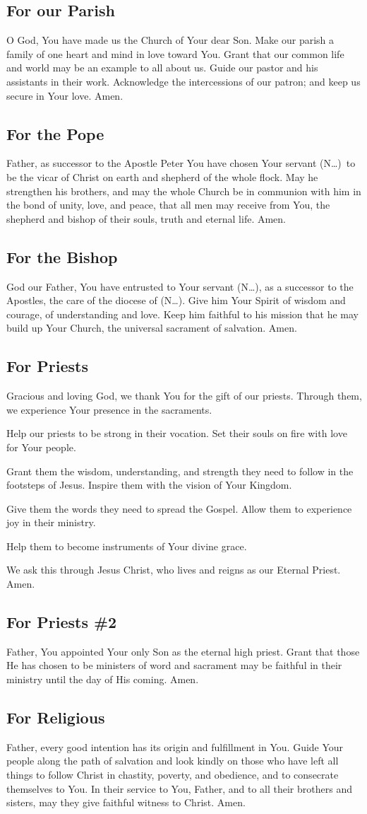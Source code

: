 \documentclass[12pt]{article}
\newcommand{\prayertitle}[1]{\subsection{#1}}
\newcommand{\insertname}{(N\dots)}
\begin{document}
\prayertitle{For our Parish}
O God, You have made us the Church of Your dear Son.
Make our parish a family of one heart and mind in love toward You.
Grant that our common life and world may be an example to all about us.
Guide our pastor and his assistants in their work.
Acknowledge the intercessions of our patron; and keep us secure in Your love.
Amen.

\prayertitle{For the Pope}
Father, as successor to the Apostle Peter You have chosen Your servant \insertname\ to be the vicar of Christ on earth and shepherd of the whole flock.
May he strengthen his brothers, and may the whole Church be in communion with him in the bond of unity, love, and peace, that all men may receive from You, the shepherd and bishop of their souls, truth and eternal life.
Amen.
\newpage
\prayertitle{For the Bishop}
God our Father, You have entrusted to Your servant \insertname, as a successor to the Apostles, the care of the diocese of \insertname.
Give him Your Spirit of wisdom and courage, of understanding and love.
Keep him faithful to his mission that he may build up Your Church, the universal sacrament of salvation.
Amen.

\prayertitle{For Priests}
Gracious and loving God, we thank You for the gift of our priests.
Through them, we experience Your presence in the sacraments.

Help our priests to be strong in their vocation.
Set their souls on fire with love for Your people.

Grant them the wisdom, understanding, and strength they need to follow in the footsteps of Jesus.
Inspire them with the vision of Your Kingdom.

Give them the words they need to spread the Gospel.
Allow them to experience joy in their ministry.

Help them to become instruments of Your divine grace.

We ask this through Jesus Christ, who lives and reigns as our Eternal Priest.
Amen.

\prayertitle{For Priests \#2}
Father, You appointed Your only Son as the eternal high priest.
Grant that those He has chosen to be ministers of word and sacrament may be faithful in their ministry until the day of His coming.
Amen.

\prayertitle{For Religious}
Father, every good intention has its origin and fulfillment in You.
Guide Your people along the path of salvation and look kindly on those who have left all things to follow Christ in chastity, poverty, and obedience, and to consecrate themselves to You.
In their service to You, Father, and to all their brothers and sisters, may they give faithful witness to Christ.
Amen.
\end{document}
